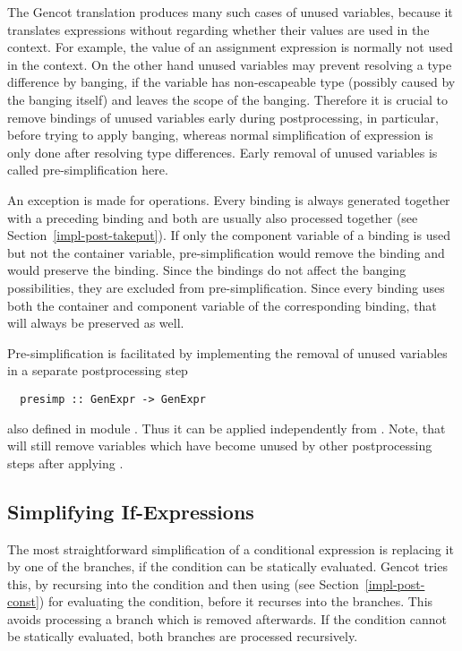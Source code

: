 The Gencot translation produces many such cases of unused variables, because it translates expressions without regarding whether
their values are used in the context. For example, the value of an assignment expression is normally not used in the context. On the
other hand unused variables may prevent resolving a type difference by banging, if the variable has non-escapeable type (possibly
caused by the banging itself) and leaves the scope of the banging. Therefore it is crucial to remove bindings of unused variables
early during postprocessing, in particular, before trying to apply banging, whereas normal simplification of  expression
is only done after resolving type differences. Early removal of unused variables is called pre-simplification here.

An exception is made for  operations. Every  binding is always generated together with a preceding 
binding and both are usually also processed together (see Section~\ref{impl-post-takeput}). If only the component variable of a
 binding is used but not the container variable, pre-simplification would remove the  binding and would preserve
the  binding. Since the  bindings do not affect the banging possibilities, they are excluded from
pre-simplification. Since every  binding uses both the container and component variable of the corresponding 
binding, that will always be preserved as well.

Pre-simplification is facilitated by implementing the removal of unused variables in a separate postprocessing step
\begin{verbatim}
  presimp :: GenExpr -> GenExpr
\end{verbatim}
also defined in module . Thus it can be applied independently from . Note, that
 will still remove variables which have become unused by other postprocessing steps after applying .

\subsection{Simplifying If-Expressions}
\label{impl-post-if}

The most straightforward simplification of a conditional expression is replacing it by one of the branches, if the condition can be
statically evaluated. Gencot tries this, by recursing into the condition and then using  (see Section~\ref{impl-post-const})
for evaluating the condition, before it recurses into the branches. This avoids processing a branch which is removed afterwards. 
If the condition cannot be statically evaluated, both branches are processed recursively.

